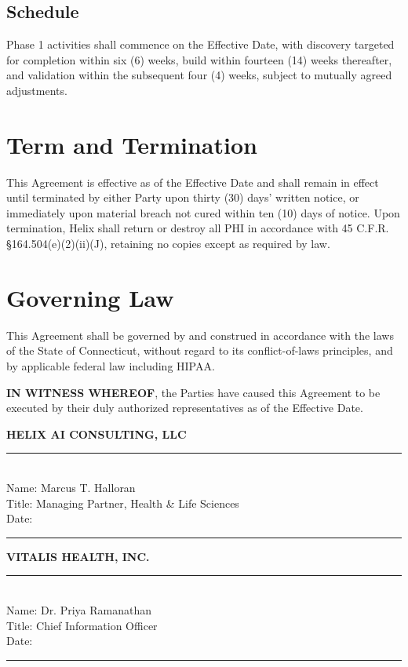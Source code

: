 \documentclass[11pt]{article}
\begin{document}
\subsection{Schedule}
Phase 1 activities shall commence on the Effective Date, with discovery targeted for completion within six (6) weeks, build within fourteen (14) weeks thereafter, and validation within the subsequent four (4) weeks, subject to mutually agreed adjustments.

\section{Term and Termination}

This Agreement is effective as of the Effective Date and shall remain in effect until terminated by either Party upon thirty (30) days' written notice, or immediately upon material breach not cured within ten (10) days of notice. Upon termination, Helix shall return or destroy all PHI in accordance with 45 C.F.R. \S 164.504(e)(2)(ii)(J), retaining no copies except as required by law.

\section{Governing Law}

This Agreement shall be governed by and construed in accordance with the laws of the State of Connecticut, without regard to its conflict-of-laws principles, and by applicable federal law including HIPAA.

\vspace{2em}

\noindent\textbf{IN WITNESS WHEREOF}, the Parties have caused this Agreement to be executed by their duly authorized representatives as of the Effective Date.

\vspace{2em}

\noindent
\begin{minipage}[t]{0.48\textwidth}
\textbf{HELIX AI CONSULTING, LLC} \\[2.5em]
\rule{0.9\textwidth}{0.4pt} \\
Name: Marcus T. Halloran \\
Title: Managing Partner, Health \& Life Sciences \\
Date: \rule{3cm}{0.4pt}
\end{minipage}
\hfill
\begin{minipage}[t]{0.48\textwidth}
\textbf{VITALIS HEALTH, INC.} \\[2.5em]
\rule{0.9\textwidth}{0.4pt} \\
Name: Dr. Priya Ramanathan \\
Title: Chief Information Officer \\
Date: \rule{3cm}{0.4pt}
\end{minipage}
\end{document}

